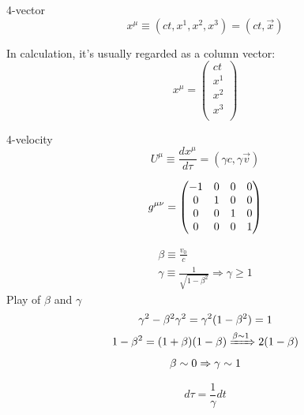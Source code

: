 \begin{description}
    \item {4-vector}
	\begin{equation}
	    \label{eqn:sr::4vectors}
		x^\mu \equiv (ct, x^1, x^2, x^3) = (ct, \vec{x})
	\end{equation}

	In calculation, it's usually regarded as a column vector:
	\begin{equation}
	    x^\mu = 
	    \begin{pmatrix}
		ct	\\
		x^1	\\
		x^2	\\
		x^3	\\
	    \end{pmatrix}
	\end{equation}

    \item{4-velocity}
	\begin{equation}
	    \label{eqn:sr::4velocity}
	    U^\mu \equiv \frac{dx^\mu}{d\tau} = (\gamma c, \gamma \vec{v})
	\end{equation}

    \item[metric tensor] 
	\begin{equation}
	    \label{eqn:sr::metricTensor}
	    g^{\mu\nu} = 
	    \begin{pmatrix}
		-1  & 0	& 0 & 0	\\
		0   & 1	& 0 & 0 \\
		0   & 0	& 1 & 0 \\
		0   & 0	& 0 & 1 \\
	    \end{pmatrix}
	\end{equation}
    \item [$\beta$, $\gamma$]
	\begin{equation}
	    \label{eqn:sm::betaGamma}
	    \begin{gathered}
		\beta \equiv \frac{v_0}{c} \\
		\gamma	\equiv \frac{1}{\sqrt{1-\beta^2}}	\Rightarrow \gamma \ge 1
	    \end{gathered}
	\end{equation}
	Play of $\beta$ and $\gamma$
	\begin{equation}
	    \begin{gathered}
		\gamma^2 - \beta^2\gamma^2 = \gamma^2(1-\beta^2) = 1	\\
		1-\beta^2 = (1+\beta)(1-\beta) \xRightarrow{\beta\sim 1} 2(1-\beta)  \\
		\beta \sim 0 \Rightarrow \gamma \sim 1  \\
	    \end{gathered}
	\end{equation}

    \item [Proper time]
	\begin{equation}
	    \label{eqn:sr::properTime}
	    d\tau = \frac{1}{\gamma}dt
	\end{equation}
\end{description}

